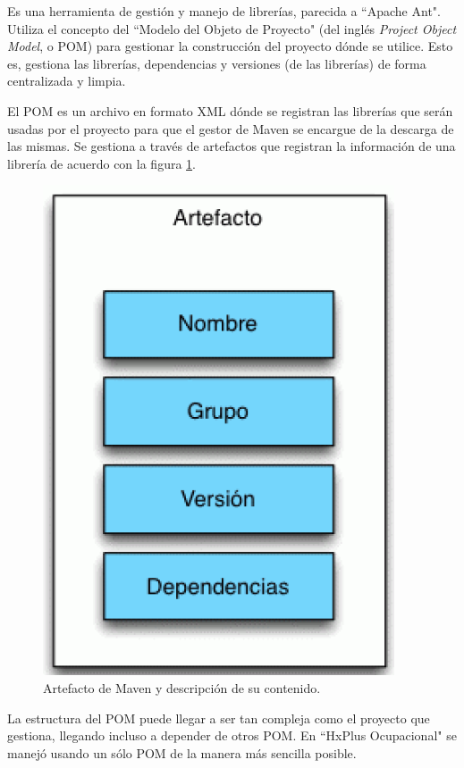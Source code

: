        Es una herramienta de gestión y manejo de librerías, parecida a ``Apache Ant". Utiliza el concepto del ``Modelo del Objeto de Proyecto" (del inglés \textit{Project Object Model}, o POM) para gestionar la construcción del proyecto dónde se utilice. Esto es, gestiona las librerías, dependencias y versiones (de las librerías) de forma centralizada y limpia.
        
        El POM es un archivo en formato XML dónde se registran las librerías que serán usadas por el proyecto  para que el gestor de Maven se encargue de la descarga de las mismas. Se gestiona a través de artefactos que registran la información de una librería de acuerdo con la figura \ref{pom-artifact}.
        
        \begin{figure}[htbp!]
            \begin{center}
                \includegraphics[scale=0.4]{figures/pomartifact}
            \end{center}
            \caption{Artefacto de Maven y descripción de su contenido.}
            \label{pom-artifact}
        \end{figure}
        
        La estructura del POM puede llegar a ser tan compleja como el proyecto que gestiona, llegando incluso a depender de otros POM. En ``HxPlus Ocupacional" se manejó usando un sólo POM de la manera más sencilla posible.
        
